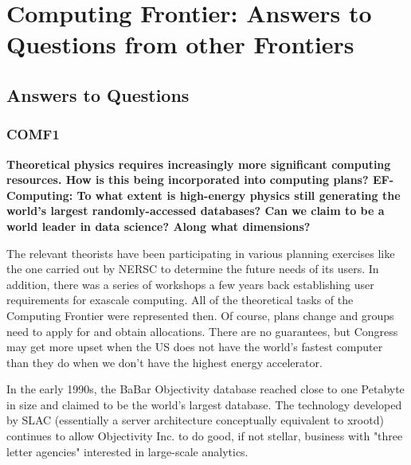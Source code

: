  
\chapter{Computing Frontier: Answers to Questions from other Frontiers}
\label{chap:mag}

\begin{center}\begin{boldmath}

%

\end{boldmath}\end{center}



\section{Answers to Questions}
\label{sec:comp-intro}






\subsection{COMF1}


{\bf
 Theoretical physics requires increasingly more significant computing resources. How
is this being incorporated into computing plans? EF-Computing: To what extent is
high-energy physics still generating the world's largest randomly-accessed databases?
Can we claim to be a world leader in data science? Along what dimensions?}

The relevant theorists have been participating in various planning
exercises like the one carried out by NERSC to determine the future
needs of its users.  In addition, there was a series of workshops a few
years back establishing user requirements for exascale computing.  All
of the theoretical tasks of the Computing Frontier were represented
then.  Of course, plans change and groups need to apply for and obtain
allocations.  There are no guarantees, but Congress may get more upset
when the US does not have the world's fastest computer than they do when
we don't have the highest energy accelerator.

In the early 1990s, the BaBar Objectivity database reached close to one
Petabyte in size and claimed to be the world's largest database.  The
technology developed by SLAC (essentially a server architecture
conceptually equivalent to xrootd) continues to allow Objectivity Inc. to
do good, if not stellar, business with "three letter agencies" interested
in large-scale analytics.

